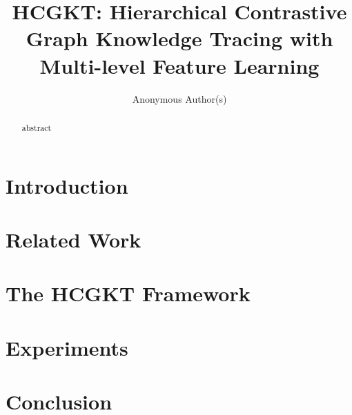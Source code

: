 \documentclass[runningheads]{llncs}
\begin{document}
\title{HCGKT: Hierarchical Contrastive Graph Knowledge Tracing with Multi-level Feature Learning}

\author{Anonymous Author(s)}

%
\maketitle              %
%
\begin{abstract}
abstract
\end{abstract}

\section{Introduction}
\label{sec:intro}


\section{Related Work}
\label{sec:related}


\section{The HCGKT Framework}
\label{sec:method}


\section{Experiments}
\label{sec:exp}


\section{Conclusion}
\label{sec:conclution}




\end{document}
